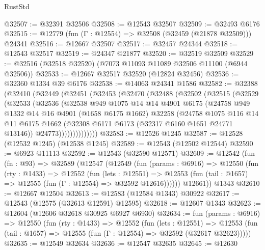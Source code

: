 \begin{lexlean}{RustStd}
\begin{coremodule}
@32507 := @32391 @32506
@32508 := @12543 @32507
@32509 := @32493 @6176
@32515 := @12779 (fun (Γ : @12554) => @32508 (@32459 (@21878 @32509))) @24341
@32516 := @12667 @32507
@32517 := @32457 @24344
@32518 := @12543 @32517
@32519 := @24347 @21877
@32520 := @32519 @32509
@32529 := @32516 (@32518 @32520) (@7073 @11093 @11089 @32506 @11100 (@6944 @32506))
@32533 := @12667 @32517 @32520 (@12824 @32456)
@32536 := @32360 @1334 @39 @6176
@32538 := @14063 @24341 @1586
@32582 := @32388
    (@32410
      (@32449
        (@32451
          (@32453
            (@32470
              (@32488
                (@32502
                  (@32515
                    (@32529
                      (@32533
                        (@32536
                          (@32538
                            @949
                            @1075
                            @14
                            @14
                            @4901
                            @6175
                            (@24758
                              @949
                              @1332
                              @14
                              @16
                              @4901
                              (@1658 @6175 @1662)
                              @32258
                              (@24758
                                @1075
                                @116
                                @14
                                @11
                                @6175
                                @1662
                                (@32308 @6171 @6173 (@32317 @6160 @1651 @24771 @13146))
                                @24773))))))))))))))
@32583 := @12526 @1245
@32587 := @12528 (@12532 @1245) (@12538 @1245)
@32589 := @12543 (@12502 @12544)
@32590 := @6923 @11113
@32592 := @12543 (@32590 @12571)
@32609 := @12542
    (fun (fn : @93) =>
    @32589
      (@12547
        (@12549
          (fun (params : @6916) =>
          @12550
            (fun (rty : @1433) =>
            @12552
              (fun (lets : @12551) =>
              @12553 (fun (tail : @1657) => @12555 (fun (Γ : @12554) => @32592 @12616))))))
        @12661))
    @1343
@32610 := @12667 @12504
@32613 := @12583 (@12584 @1343) @30922
@32617 := @12543 (@12575 (@32613 @12591) @12595)
@32618 := @12607 @1343
@32623 := @12604 (@12606 @32618 @30925 @6927 @6930)
@32634 := fun (params : @6916) =>
  @12550
    (fun (rty : @1433) =>
    @12552
      (fun (lets : @12551) =>
      @12553 (fun (tail : @1657) => @12555 (fun (Γ : @12554) => @32592 (@32617 @32623)))))
@32635 := @12549 @32634
@32636 := @12547 @32635
@32645 := @12630

\end{coremodule}
\end{lexlean}
